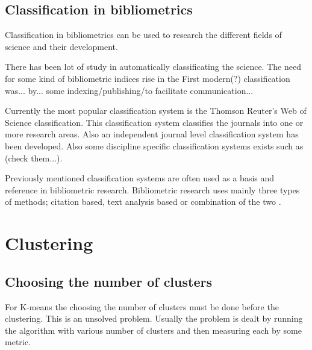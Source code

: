 \subsection{Classification in bibliometrics}
Classification in bibliometrics can be used to research the 
different fields of science and their development.

There has been lot of study in automatically classificating the 
science. 
The need for some kind of bibliometric indices rise in the 
First modern(?) classification was... by... some 
indexing/publishing/to facilitate communication...

Currently the most popular classification system is the Thomson 
Reuter's Web of Science classification. This classification 
system classifies the journals into one or more research areas. 
\cite{waltman_new_2012} 
Also an independent journal level classification system has been 
developed. \cite{archambault_towards_2011}
Also some discipline specific classification systems exists such 
as (check them...).

Previously mentioned classification systems are often used as a 
basis and reference in bibliometric research. Bibliometric 
research uses mainly three types of methods; citation based, text 
analysis based or combination of the two 
\cite{janssens_hybrid_2009}.


\section{Clustering}



\subsection{Choosing the number of clusters}
For K-means the choosing the number of clusters must be done before
the clustering. This is an unsolved problem. 
Usually the 
problem is dealt by running the algorithm with various number of 
clusters and then measuring each by some metric. 


